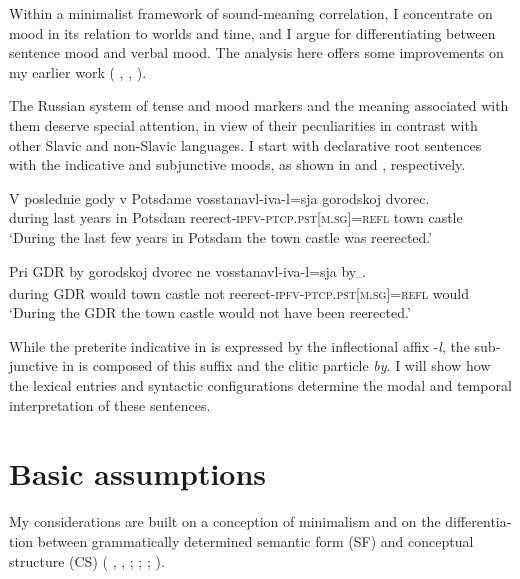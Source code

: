 \documentclass[output=paper,colorlinks,citecolor=brown]{langscibook}
\begin{document}
\begin{otherlanguage}{english}
Within a minimalist framework of sound-meaning correlation, I concentrate on mood in its relation to worlds and time, and I argue for differentiating between sentence mood and verbal mood. The analysis here offers some improvements on my earlier work (\citeauthor{Zimmermann2009} \citeyear{Zimmermann2009}, \citeyear{Zimmermann2010}, \citeyear{Zimmermann2013}).

The Russian system of tense and mood markers and the meaning associated with them deserve special attention, in view of their peculiarities in contrast with other Slavic and non-Slavic languages. I start with declarative root sentences with the indicative and subjunctive moods, as shown in  and , respectively.

\ea\label{ex:16:1}
\gll	V poslednie gody v Potsdame vosstanavl-iva-l=sja gorodskoj dvorec.\\
during last years in Potsdam reerect-\textsc{ipfv}-\textsc{ptcp}.\textsc{pst}[\textsc{m}.\textsc{sg}]=\textsc{refl} town castle \\
\glt `During the last few years in Potsdam the town castle was reerected.'
\z

\ea\label{ex:16:2}
\gll Pri GDR by\textsubscript{\textalpha} gorodskoj dvorec ne vosstanavl-iva-l=sja by{\textsubscript–}\textsubscript{\textalpha}. \\
during GDR would town castle not reerect-\textsc{ipfv}-\textsc{ptcp}.\textsc{pst}[\textsc{m}.\textsc{sg}]=\textsc{refl} would \\
\glt `During the GDR the town castle would not have been reerected.'
\z

\noindent While the preterite indicative in  is expressed by the inflectional affix -\textit{l}, the subjunctive in  is composed of this suffix and the clitic particle \textit{by}. I will show how the lexical entries and syntactic configurations determine the modal and temporal interpretation of these sentences.

\section{Basic assumptions}

My considerations are built on a conception of minimalism and on the differentiation between grammatically determined semantic form (SF) and conceptual structure (CS) (\citeauthor{Bierwisch1983} \citeyear{Bierwisch1983}, \citeyear{Bierwisch1985}, \citeyear{Bierwisch2007}; \citealt{Bierwisch-Lang1987}; \citealt{Dolling1997}; \citealt{Lang-Maienborn2011}).


\end{otherlanguage}
\end{document}
